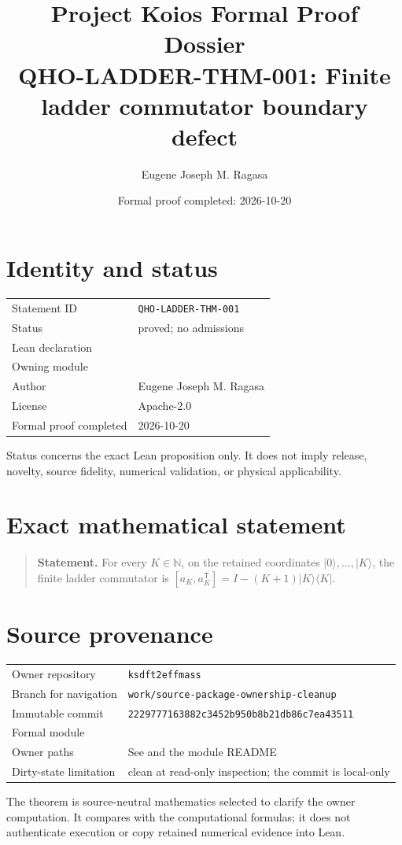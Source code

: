 \documentclass[11pt]{article}
\title{Project Koios Formal Proof Dossier\\\large QHO-LADDER-THM-001: Finite ladder commutator boundary defect}
\author{Eugene Joseph M. Ragasa}
\date{Formal proof completed: 2026-10-20}
\begin{document}
\maketitle

\section{Identity and status}
\begin{tabularx}{\textwidth}{@{}lY@{}}\toprule
Statement ID & \texttt{QHO-LADDER-THM-001} \\
Status & proved; no admissions \\
Lean declaration &  \\
Owning module &  \\
Author & Eugene Joseph M. Ragasa \\
License & Apache-2.0 \\
Formal proof completed & 2026-10-20 \\
\bottomrule\end{tabularx}
Status concerns the exact Lean proposition only. It does not imply release, novelty,
source fidelity, numerical validation, or physical applicability.

\section{Exact mathematical statement}
\begin{quote}\textbf{Statement.} For every $K\in\mathbb N$, on the retained coordinates $\lvert0\rangle,\ldots,\lvert K\rangle$, the finite ladder commutator is $[a_K,a_K^{\mathsf T}]=I-(K+1)\lvert K\rangle\langle K\rvert$.\end{quote}

\section{Source provenance}
\begin{tabularx}{\textwidth}{@{}lY@{}}\toprule
Owner repository & \texttt{ksdft2effmass} \\
Branch for navigation & \texttt{work/source-package-ownership-cleanup} \\
Immutable commit & \texttt{2229777163882c3452b950b8b21db86c7ea43511} \\
Formal module &  \\
Owner paths & See  and the module README \\
Dirty-state limitation & clean at read-only inspection; the commit is local-only \\
\bottomrule\end{tabularx}
The theorem is source-neutral mathematics selected to clarify the owner computation. It
compares with the computational formulas; it does not authenticate execution or copy
retained numerical evidence into Lean.
\end{document}
